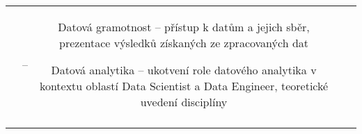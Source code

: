 \begin{landscape}
\begin{table}[htbp]
{\begin{tabularx}{\linewidth}{CCCCC}
&

–

&

Datová gramotnost – přístup k datům a jejich sběr, prezentace výsledků získaných ze zpracovaných dat

Datová analytika – ukotvení role datového analytika v kontextu oblastí Data Scientist a Data Engineer, teoretické uvedení disciplíny  

\\

\tabularnewline
\bottomrule
\end{tabularx}

}

\end{table}

\end{landscape}